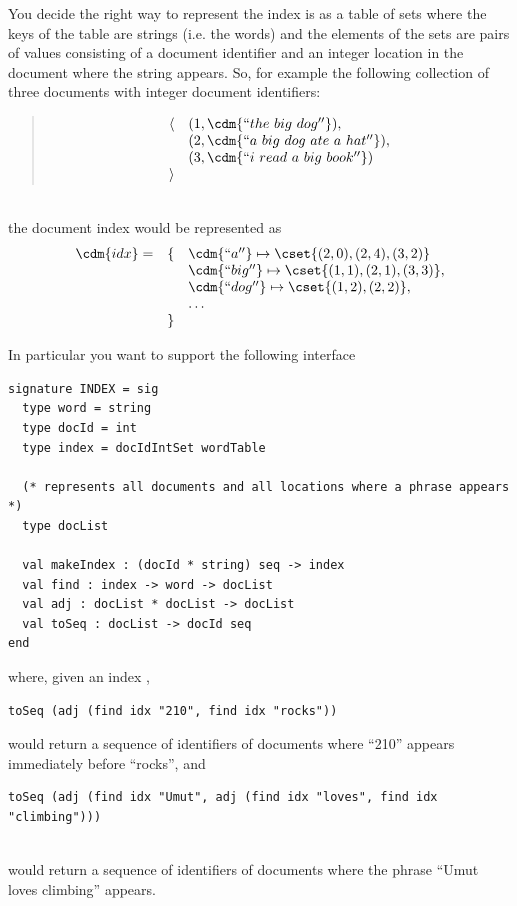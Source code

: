 You decide the right way to represent the index is as a table of sets
where the keys of the table are strings (i.e. the words) and the
elements of the sets are pairs of values consisting of a document
identifier and an integer location in the document where the string
appears.  So, for example the following collection of three documents
with integer document identifiers:
%
\begin{quote}
\[
\begin{array}{ll}
\langle 
& (1, \cdm{``the~big~dog''}), 
\\
& (2, \cdm{``a~big~dog~ate~a~hat''}),
\\
& (3, \cdm{``i~read~a~big~book''})
\\
\rangle
\end{array}
\]
\end{quote}
\\
the document index would be represented as
\[
\begin{array}{lll}
\cdm{idx} = & \{ & \cdm{``a''} \mapsto \cset{(2,0),(2,4),(3,2)}
\\
            &    &  \cdm{``big''} \mapsto \cset{(1,1),(2,1),(3,3)},
\\
            &   & \cdm{``dog''} \mapsto \cset{(1,2),(2,2)},
\\
            &   & \ldots
\\
            & \} &
\end{array}
\]

In particular you want to support the following interface
%
\begin{lstlisting}[language=caml,numbers=none]
signature INDEX = sig
  type word = string
  type docId = int
  type index = docIdIntSet wordTable
  
  (* represents all documents and all locations where a phrase appears *)
  type docList

  val makeIndex : (docId * string) seq -> index    
  val find : index -> word -> docList
  val adj : docList * docList -> docList
  val toSeq : docList -> docId seq 
end
\end{lstlisting}
%
where, given an index ,
%
\begin{lstlisting}[language=caml,numbers=none]
toSeq (adj (find idx "210", find idx "rocks"))
\end{lstlisting}
%
would return a sequence of identifiers of documents
where ``210'' appears immediately before ``rocks'', and 
\\
\begin{lstlisting}[language=caml,numbers=none]
toSeq (adj (find idx "Umut", adj (find idx "loves", find idx "climbing")))
\end{lstlisting}
\\
would return a sequence of identifiers of documents
where the phrase ``Umut loves climbing'' appears.


